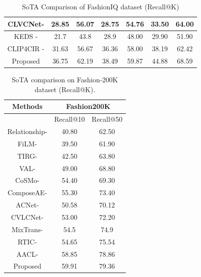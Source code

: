 \documentclass[10pt,lineno]{wlpeerj}
\begin{document}
\begin{table}[htbp!]
{\begin{tabular}{|c|cc|cc|cc|}
CLVCNet-\cite{CLVCNet}        & \multicolumn{1}{c|}{28.85} & 56.07 & \multicolumn{1}{c|}{28.75} & 54.76 & \multicolumn{1}{c|}{33.50} & 64.00 \\ \hline
KEDS -\cite{BKP}        & \multicolumn{1}{c|}{21.7} &  43.8 & \multicolumn{1}{c|}{28.9} & 48.00 & \multicolumn{1}{c|}{29.90} & 51.90 \\ \hline
CLIP4CIR -\cite{CLIP4CIR_Rev2}        & \multicolumn{1}{c|}{31.63} &  56.67 & \multicolumn{1}{c|}{36.36} & 58.00 & \multicolumn{1}{c|}{38.19} & 62.42 \\ \hline
Proposed      & \multicolumn{1}{c|}{36.75} & 62.19 & \multicolumn{1}{c|}{38.49} & 59.87 & \multicolumn{1}{c|}{44.88} & 68.59 \\ \hline
\end{tabular}%
}
\caption{SoTA Comparison of FashionIQ dataset (Recall@K)}
\label{tab:fashioniq_results}
\end{table}


\begin{table}[htbp!]
\centering
\begin{tabular}{|c|cc|}
\hline
\textbf{Methods}   & \multicolumn{2}{c|}{Fashion200K}   \\ \hline
                   & \multicolumn{1}{c|}{Recall@10}  & Recall@50  \\ \hline
Relationship-\cite{relationship} & \multicolumn{1}{c|}{40.80} & 62.50 \\ \hline
FiLM-\cite{film}                 & \multicolumn{1}{c|}{39.50} & 61.90 \\ \hline
TIRG-\cite{Nam}                  & \multicolumn{1}{c|}{42.50} & 63.80 \\ \hline
VAL-\cite{VAL}                   & \multicolumn{1}{c|}{49.00} & 68.80 \\ \hline
CoSMo-\cite{CoSMo}               & \multicolumn{1}{c|}{54.40} & 69.30 \\ \hline
ComposeAE-\cite{ComposeAE}       & \multicolumn{1}{c|}{55.30} & 73.40 \\ \hline
ACNet-\cite{ACNet}               & \multicolumn{1}{c|}{50.58} & 70.12 \\ \hline
CVLCNet-\cite{CLVCNet}          & \multicolumn{1}{c|}{53.00} & 72.20 \\ \hline
MixTrans-\cite{Mix_Trans}       & \multicolumn{1}{c|}{54.5}  & 74.9  \\ \hline
RTIC-\cite{RTIC}                 & \multicolumn{1}{c|}{54.65} & 75.54 \\ \hline
AACL-\cite{AACL}                 & \multicolumn{1}{c|}{58.85} & 78.86 \\ \hline
Proposed                         & \multicolumn{1}{c|}{59.91} & 79.36 \\ \hline
\end{tabular}
\caption{SoTA comparison on Fashion-200K dataset (Recall@K).}
\label{tab:fashion200K_results}
\end{table}
\end{document}
